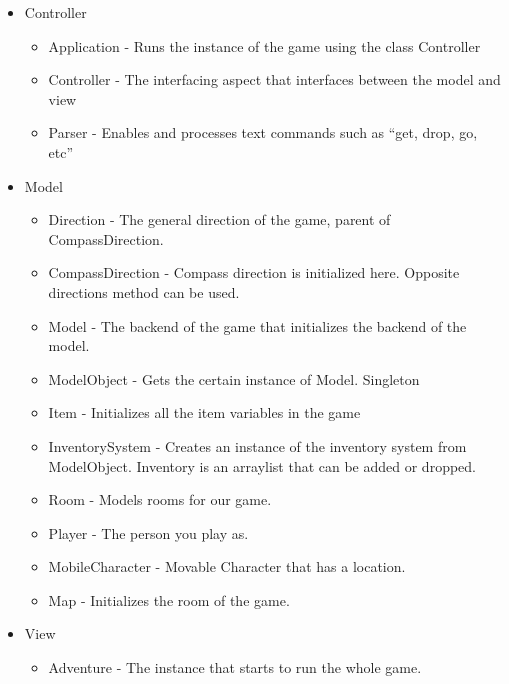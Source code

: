 \documentclass[a4paper, 11pt]{article}
\begin{document}
        \begin{itemize}
            \item Controller
            \begin{itemize}
                \item Application - Runs the instance of the game using the class Controller
                \item Controller - The interfacing aspect that interfaces between the model and view
                \item Parser - Enables and processes text commands such as “get, drop, go, etc”
            \end{itemize}
            \item Model
            \begin{itemize}
                \item Direction - The general direction of the game, parent of CompassDirection.
                \item CompassDirection - Compass direction is initialized here. Opposite directions method can be used.
                \item Model - The backend of the game that initializes the backend of the model.
                \item ModelObject - Gets the certain instance of Model. Singleton
                \item Item - Initializes all the item variables in the game
                \item InventorySystem - Creates an instance of the inventory system from ModelObject. Inventory is an arraylist that can be added or dropped.
                \item Room - Models rooms for our game.
                \item Player - The person you play as.
                \item MobileCharacter  - Movable Character that has a location.
                \item Map - Initializes the room of the game.
            \end{itemize}
            \item View
            \begin{itemize}
                \item Adventure - The instance that starts to run the whole game.
            \end{itemize}
        \end{itemize}
\end{document}
